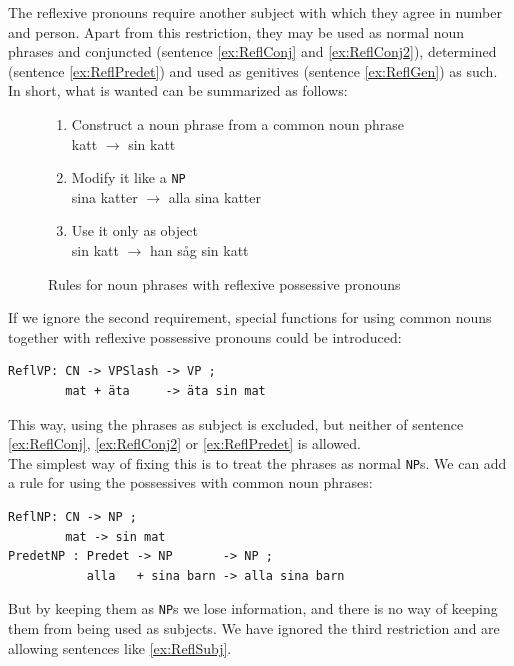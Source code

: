 \documentclass{report}
\begin{document}
The reflexive pronouns require another subject with which they agree in
number and person. Apart from this restriction, they may be used as normal
noun phrases and conjuncted (sentence \ref{ex:ReflConj} and \ref{ex:ReflConj2}),
determined (sentence \ref{ex:ReflPredet}) and used as genitives (sentence
\ref{ex:ReflGen}) as such.
In short, what is wanted can be summarized as follows:
\begin{figure}
\begin{enumerate}
\item{
Construct a noun phrase from a common noun phrase \\
katt $\rightarrow$ sin katt} %
\item{Modify it like a \verb|NP|\\
sina katter $\rightarrow$ alla sina katter}
\item{Use it only as object\\
sin katt $\rightarrow$ han såg sin katt }
\end{enumerate}
\caption{Rules for noun phrases with reflexive possessive pronouns}
\label{fig:reflrestrict}
\end{figure}
If we ignore the second requirement, special functions for using common nouns
together with reflexive possessive pronouns could be introduced:
\begin{verbatim}
ReflVP: CN -> VPSlash -> VP ;
        mat + äta     -> äta sin mat 
\end{verbatim}
This way, using the phrases as subject is excluded, but neither of sentence
\ref{ex:ReflConj}, \ref{ex:ReflConj2} or \ref{ex:ReflPredet} is allowed.\\
The simplest way of fixing this is to treat the phrases as normal \verb_NP_s.
We can add a rule for using the possessives with common noun phrases:
\begin{verbatim}
ReflNP: CN -> NP ;
        mat -> sin mat 
PredetNP : Predet -> NP       -> NP ;
           alla   + sina barn -> alla sina barn
\end{verbatim}
But by keeping them as \verb_NP_s we lose information, and there is no way of
keeping them from being used as subjects. We have ignored the third restriction
and are allowing sentences like \ref{ex:ReflSubj}.
\end{document}
